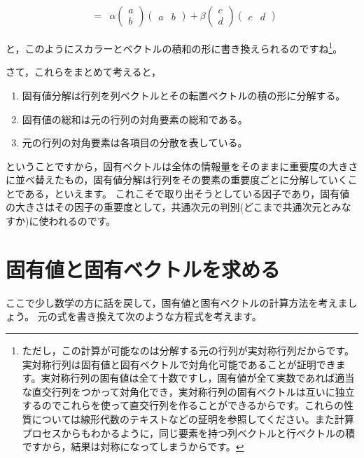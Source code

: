 \documentclass{ltjsbook}
\begin{document}
\[\begin{array}{lll}
		              &                                                                                                                                            \\
		              & = & \alpha \begin{pmatrix}a\\b\end{pmatrix}\begin{pmatrix}a &b\end{pmatrix} +
		\beta \begin{pmatrix} c\\d \end{pmatrix}\begin{pmatrix}c&d\end{pmatrix}
	\end{array}
\]

と，このようにスカラーとベクトルの積和の形に書き換えられるのですね\footnote{ただし，この計算が可能なのは分解する元の行列が実対称行列だからです。実対称行列は固有値と固有ベクトルで対角化可能であることが証明できます。実対称行列の固有値は全て十数ですし，固有値が全て実数であれば適当な直交行列をつかって対角化でき，実対称行列の固有ベクトルは互いに独立するのでこれらを使って直交行列を作ることができるからです。これらの性質については線形代数のテキストなどの証明を参照してください。また計算プロセスからもわかるように，同じ要素を持つ列ベクトルと行ベクトルの積ですから，結果は対称になってしまうからです。}。

さて，これらをまとめて考えると，
\begin{enumerate}
	\item 固有値分解は行列を列ベクトルとその転置ベクトルの積の形に分解する。
	\item 固有値の総和は元の行列の対角要素の総和である。
	\item 元の行列の対角要素は各項目の分散を表している。
\end{enumerate}
ということですから，固有ベクトルは全体の情報量をそのままに重要度の大きさに並べ替えたもの，固有値分解は行列をその要素の重要度ごとに分解していくことである，といえます。
これこそで取り出そうとしている因子であり，固有値の大きさはその因子の重要度として，共通次元の判別(どこまで共通次元とみなすか)に使われるのです。

\section{固有値と固有ベクトルを求める}
ここで少し数学の方に話を戻して，固有値と固有ベクトルの計算方法を考えましょう。
元の式を書き換えて次のような方程式を考えます。
\end{document}
